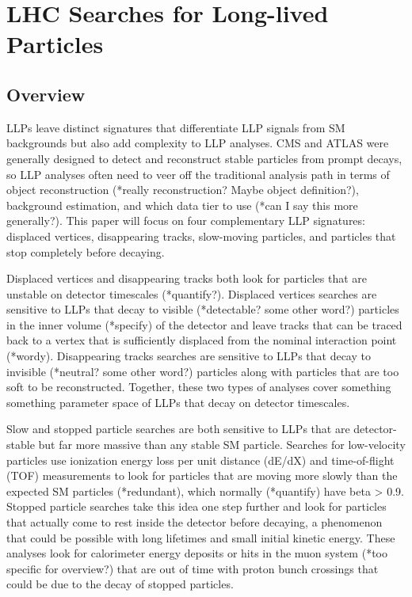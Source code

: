 \documentclass[12pt]{article}
\begin{document}
\section{LHC Searches for Long-lived Particles}
\subsection{Overview}
        LLPs leave distinct signatures that differentiate LLP signals from SM backgrounds but also add complexity to LLP analyses. CMS and ATLAS were generally designed to detect and reconstruct stable particles from prompt decays, so LLP analyses often need to veer off the traditional analysis path in terms of object reconstruction (*really reconstruction? Maybe object definition?), background estimation, and which data tier to use (*can I say this more generally?). This paper will focus on four complementary LLP signatures: displaced vertices, disappearing tracks, slow-moving particles, and particles that stop completely before decaying.

        Displaced vertices and disappearing tracks both look for particles that are unstable on detector timescales (*quantify?). Displaced vertices searches are sensitive to LLPs that decay to visible (*detectable? some other word?) particles in the inner volume (*specify) of the detector and leave tracks that can be traced back to a vertex that is sufficiently displaced from the nominal interaction point (*wordy). Disappearing tracks searches are sensitive to LLPs that decay to invisible (*neutral? some other word?) particles along with particles that are too soft to be reconstructed. Together, these two types of analyses cover something something parameter space of LLPs that decay on detector timescales.

        Slow and stopped particle searches are both sensitive to LLPs that are detector-stable but far more massive than any stable SM particle. Searches for low-velocity particles use ionization energy loss per unit distance (dE/dX) and time-of-flight (TOF) measurements to look for particles that are moving more slowly than the expected SM particles (*redundant), which normally (*quantify) have beta > 0.9. Stopped particle searches take this idea one step further and look for particles that actually come to rest inside the detector before decaying, a phenomenon that could be possible with long lifetimes and small initial kinetic energy. These analyses look for calorimeter energy deposits or hits in the muon system (*too specific for overview?) that are out of time with proton bunch crossings that could be due to the decay of stopped particles.
\end{document}
